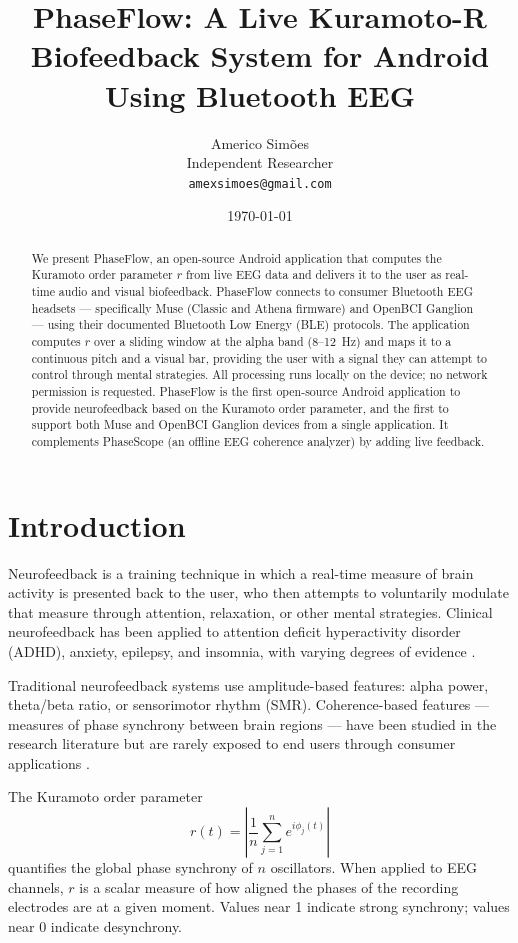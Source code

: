 \documentclass[11pt,a4paper]{article}
\title{\textbf{PhaseFlow: A Live Kuramoto-R Biofeedback System for Android Using Bluetooth EEG}}
\author{Americo Sim\~oes\\ \small Independent Researcher\\ \small \texttt{amexsimoes@gmail.com}}
\date{\today}
\begin{document}
\maketitle

\begin{abstract}
We present PhaseFlow, an open-source Android application that computes the Kuramoto order parameter $r$ from live EEG data and delivers it to the user as real-time audio and visual biofeedback. PhaseFlow connects to consumer Bluetooth EEG headsets — specifically Muse (Classic and Athena firmware) and OpenBCI Ganglion — using their documented Bluetooth Low Energy (BLE) protocols. The application computes $r$ over a sliding window at the alpha band (8--12~Hz) and maps it to a continuous pitch and a visual bar, providing the user with a signal they can attempt to control through mental strategies. All processing runs locally on the device; no network permission is requested. PhaseFlow is the first open-source Android application to provide neurofeedback based on the Kuramoto order parameter, and the first to support both Muse and OpenBCI Ganglion devices from a single application. It complements PhaseScope (an offline EEG coherence analyzer) by adding live feedback.
\end{abstract}

\section{Introduction}

Neurofeedback is a training technique in which a real-time measure of brain activity is presented back to the user, who then attempts to voluntarily modulate that measure through attention, relaxation, or other mental strategies. Clinical neurofeedback has been applied to attention deficit hyperactivity disorder (ADHD), anxiety, epilepsy, and insomnia, with varying degrees of evidence \cite{lubar1997,egner2002}.

Traditional neurofeedback systems use amplitude-based features: alpha power, theta/beta ratio, or sensorimotor rhythm (SMR). Coherence-based features — measures of phase synchrony between brain regions — have been studied in the research literature but are rarely exposed to end users through consumer applications \cite{lutz2004,engel2001}.

The Kuramoto order parameter
\begin{equation}
r(t) = \left| \frac{1}{n} \sum_{j=1}^{n} e^{i \phi_j(t)} \right|
\end{equation}
quantifies the global phase synchrony of $n$ oscillators. When applied to EEG channels, $r$ is a scalar measure of how aligned the phases of the recording electrodes are at a given moment. Values near 1 indicate strong synchrony; values near 0 indicate desynchrony.
\end{document}
